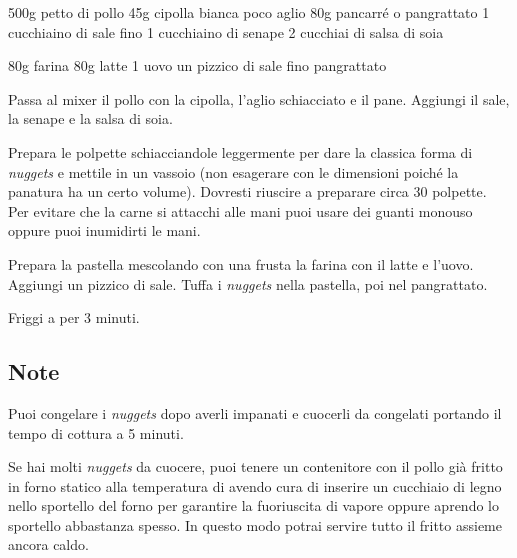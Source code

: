 \begin{ingreds}
	500g  petto di pollo 
	45g cipolla bianca 
	poco aglio
	80g pancarré o pangrattato 
	1 cucchiaino di sale fino
	1 cucchiaino di senape 
	2 cucchiai di salsa di soia 

\columnbreak
{}
	80g farina 
	80g latte 
	1 uovo 
	un pizzico di sale fino
	pangrattato 
\end{ingreds}

\begin{method}
Passa al mixer il pollo con la cipolla, l'aglio schiacciato e il pane. Aggiungi il sale, la senape e la salsa di soia.

Prepara le polpette schiacciandole leggermente per dare la classica forma di \textit{nuggets} e mettile in un vassoio (non esagerare con le dimensioni poiché la panatura ha un certo volume). Dovresti riuscire a preparare circa 30 polpette. Per evitare che la carne si attacchi alle mani puoi usare dei guanti monouso oppure puoi inumidirti le mani.

Prepara la pastella mescolando con una frusta la farina con il latte e l'uovo. Aggiungi un pizzico di sale. Tuffa i \textit{nuggets} nella pastella, poi nel pangrattato.

Friggi a  per 3 minuti.

\end {method}

\subsection*{Note}
		Puoi congelare i \textit{nuggets} dopo averli impanati e cuocerli da congelati portando il tempo di cottura a 5 minuti.

		Se hai molti \textit{nuggets} da cuocere, puoi tenere un contenitore con il pollo già fritto in forno statico alla temperatura di  avendo cura di inserire un cucchiaio di legno nello sportello del forno per garantire la fuoriuscita di vapore oppure aprendo lo sportello abbastanza spesso. In questo modo potrai servire tutto il fritto assieme ancora caldo.


